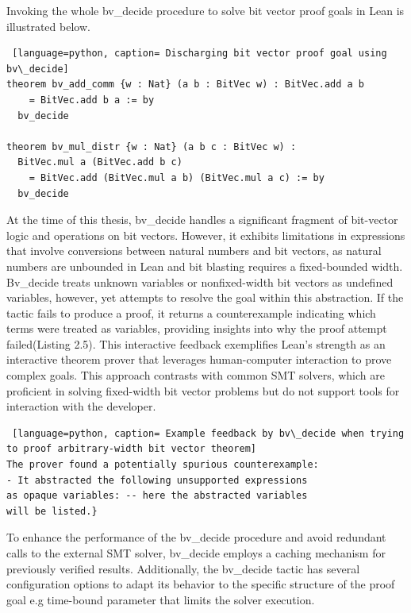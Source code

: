 Invoking the whole bv\_decide procedure to solve bit vector proof goals in Lean is illustrated below.
\begin{lstlisting} [language=python, caption= Discharging bit vector proof goal using bv\_decide]
theorem bv_add_comm {w : Nat} (a b : BitVec w) : BitVec.add a b 
    = BitVec.add b a := by
  bv_decide

theorem bv_mul_distr {w : Nat} (a b c : BitVec w) : 
  BitVec.mul a (BitVec.add b c) 
    = BitVec.add (BitVec.mul a b) (BitVec.mul a c) := by
  bv_decide
\end{lstlisting}

At the time of this thesis, bv\_decide handles a significant fragment of bit-vector logic and operations on bit vectors. However, it exhibits limitations in expressions that involve conversions between natural numbers and bit vectors, as natural numbers are unbounded in Lean and bit blasting requires a fixed-bounded width. Bv\_decide treats unknown variables or nonfixed-width bit vectors as undefined variables, however, yet attempts to resolve the goal within this abstraction. If the tactic fails to produce a proof, it returns a counterexample indicating which terms were treated as variables, providing insights into why the proof attempt failed(Listing 2.5). This interactive feedback exemplifies Lean's strength as an interactive theorem prover that leverages human-computer interaction to prove complex goals. This approach contrasts with common SMT solvers, which are proficient in solving fixed-width bit vector problems but do not support tools for interaction with the developer.


\begin{lstlisting} [language=python, caption= Example feedback by bv\_decide when trying to proof arbitrary-width bit vector theorem]
The prover found a potentially spurious counterexample:
- It abstracted the following unsupported expressions
as opaque variables: -- here the abstracted variables
will be listed.}
\end{lstlisting}





To enhance the performance of the bv\_decide procedure and avoid redundant calls to the external SMT solver, bv\_decide employs a caching mechanism for previously verified results. Additionally, the bv\_decide tactic has several configuration options to adapt its behavior to the specific structure of the proof goal e.g time-bound parameter that limits the solver execution. 

